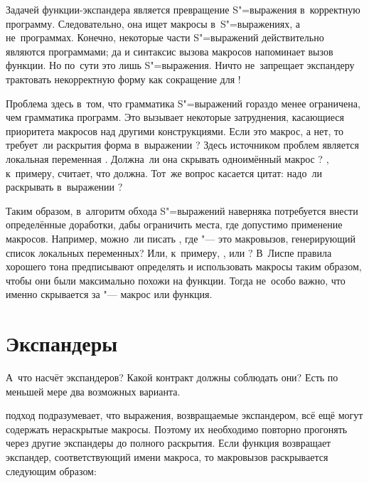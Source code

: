 Задачей функции-экспандера является превращение S"=выражения в~корректную
программу. Следовательно, она ищет макросы в~S"=выражениях, а не~программах.
Конечно, некоторые части S"=выражений действительно являются программами; да и
синтаксис вызова макросов напоминает вызов функции. Но по~сути это лишь
S"=выражения. Ничто не~запрещает экспандеру трактовать некорректную форму
 как сокращение для !

Проблема здесь в~том, что грамматика S"=выражений гораздо менее ограничена, чем
грамматика программ. Это вызывает некоторые затруднения, касающиеся приоритета
макросов над другими конструкциями. Если  это макрос, а  нет,
то требует~ли раскрытия форма  в~выражении ? Здесь источником проблем является локальная переменная
. Должна~ли она скрывать одноимённый макрос ? \RnRS, к~примеру,
считает, что должна. Тот~же вопрос касается цитат: надо~ли раскрывать 
в~выражении ?

Таким образом, в~алгоритм обхода S"=выражений наверняка потребуется внести
определённые доработки, дабы ограничить места, где допустимо применение
макросов. Например, можно~ли писать , где  "---
это макровызов, генерирующий список локальных переменных? Или, к~примеру,
, или ? В~Лиспе правила хорошего
тона предписывают определять и использовать макросы таким образом, чтобы они
были максимально похожи на функции. Тогда не~особо важно, что именно скрывается
за  "--- макрос или функция.


\section{Экспандеры}\label{macros/sect:expandes}

А~что насчёт экспандеров? Какой контракт должны соблюдать они? Есть по меньшей
мере два возможных варианта.

 подход подразумевает, что выражения, возвращаемые
экспандером, всё ещё могут содержать нераскрытые макросы. Поэтому их необходимо
повторно прогонять через другие экспандеры до полного раскрытия. Если функция
 возвращает экспандер, соответствующий имени макроса, то
макровызов  раскрывается следующим образом:

